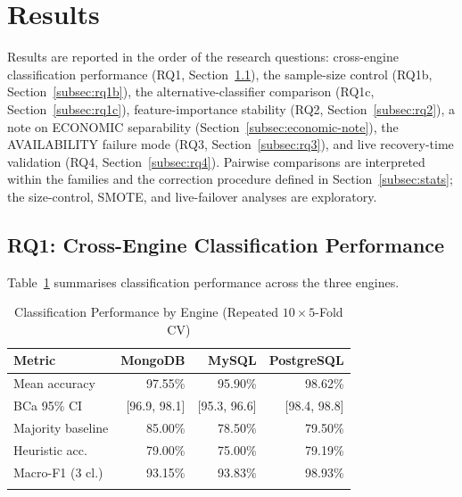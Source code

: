 \documentclass[iicol,pdflatex,sn-mathphys-num]{sn-jnl}
\theoremstyle{thmstyleone}
\theoremstyle{thmstylethree}
\begin{document}
\section{Results}\label{sec:results}

Results are reported in the order of the research questions:
cross-engine classification performance (RQ1,
Section~\ref{subsec:rq1}), the sample-size control (RQ1b,
Section~\ref{subsec:rq1b}), the alternative-classifier comparison
(RQ1c, Section~\ref{subsec:rq1c}), feature-importance stability (RQ2,
Section~\ref{subsec:rq2}), a note on ECONOMIC separability
(Section~\ref{subsec:economic-note}), the AVAILABILITY failure mode
(RQ3, Section~\ref{subsec:rq3}), and live recovery-time validation
(RQ4, Section~\ref{subsec:rq4}). Pairwise comparisons are interpreted
within the families and the correction procedure defined in
Section~\ref{subsec:stats}; the size-control, SMOTE, and live-failover
analyses are exploratory.

\subsection{RQ1: Cross-Engine Classification Performance}\label{subsec:rq1}

Table~\ref{tab:main-results} summarises classification performance
across the three engines.

\begin{table}[h]
\caption{Classification Performance by Engine (Repeated $10\times5$-Fold CV)}\label{tab:main-results}
\begin{tabular}{@{}lrrr@{}}
\toprule
Metric & MongoDB & MySQL & PostgreSQL \\
\midrule
Mean accuracy & 97.55\% & 95.90\% & 98.62\% \\
BCa 95\% CI & [96.9, 98.1] & [95.3, 96.6] & [98.4, 98.8] \\
Majority baseline & 85.00\% & 78.50\% & 79.50\% \\
Heuristic acc. & 79.00\% & 75.00\% & 79.19\% \\
Macro-F1 (3 cl.)\footnotemark[1] & 93.15\% & 93.83\% & 98.93\% \\
\botrule
\end{tabular}
\end{table}
\end{document}
